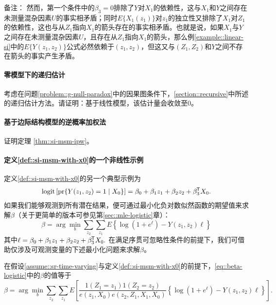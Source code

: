 备注：  
然而，第一个条件中的$\beta_3 = 0$排除了$Y$对$X_1$的依赖性，这与$X_1$和$Y$之间存在未测量混杂因素$U$的事实相矛盾；同时$E\{ X_1(z_1)\} $对$z_1$的独立性又排除了$X_1$对$Z_1$的依赖性，这也与从$Z_1$指向$X_1$的箭头存在的事实相矛盾。也就是说，如果$X_1$与$Y$之间存在未测量混杂因素$U$，且存在从$Z_1$指向$X_1$的箭头，那么例\ref{example::linear-si}中的$E\{ Y(z_1, z_2) \} $公式必然依赖于$(z_1, z_2)$，但这又与$(Z_1, Z_2)$和$Y$之间不存在箭头的事实产生矛盾。  


\paragraph{零模型下的递归估计}\label{problem::recursive-null}


考虑在问题\ref{problem::g-null-paradox}中的因果图条件下，\ref{section::recursive}中所述的递归估计方法。请证明：基于线性模型，该估计量会收敛至0。 



\paragraph{基于边际结构模型的逆概率加权法}\label{problem::ipw-msm}


证明定理 \ref{thm::si-msm-ipw}。 


\paragraph{定义\ref{def::si-msm-with-x0}的一个非线性示例}\label{hw::logistic-msm}


定义\ref{def::si-msm-with-x0}的另一个典型示例为\begin{equation}\label{eq::logistic-msm}
\text{logit} \left[ \textup{pr}\{  Y(z_1, z_2)  =1  \mid X_0\}  \right] = \beta_0 + \beta_1 z_1 + \beta_2 z_2 + \beta_3^{\mkern-1.5mu\mathsf{T}} X_0 .
\end{equation}  
如果我们能够观测到所有潜在结果，便可通过最小化负对数似然函数的期望值来求解$\beta$（关于更简单的版本可参见第\ref{sec::mle-logistic}章）：  
\begin{equation}
\label{eq::beta-logistic}
\beta = \arg\min_b   \sum_{z_2}\sum_{z_1}  E\left\{   \log (1 + e^{\ell })
- Y(z_1, z_2)  \ell  \right\}
\end{equation}  
其中$\ell = \beta_0 + \beta_1 z_1 + \beta_2 z_2 + \beta_3^{\mkern-1.5mu\mathsf{T}} X_0.$  
在满足序贯可忽略性条件的前提下，我们可借助仅涉及可观测变量的下述最小化问题来求解$\beta$。


\begin{theorem}
[在边际结构模型下采用逆概率加权法]
\label{thm::si-msm-ipw-logistic}
在假设\ref{assume::sr-time-varying}与定义\ref{def::si-msm-with-x0}的前提下，\eqref{eq::beta-logistic}中的$\beta$的值等于$$
\beta = \arg\min_b \sum_{z_2}\sum_{z_1}  E\left[   \frac{  1(Z_1=z_1) 1(Z_2=z_2)   }{   e(z_1, X_0) e(z_2, Z_1, X_1, X_0)     }      
\left\{   \log (1 + e^{\ell })
- Y(z_1, z_2)  \ell  \right\} \right] .
$$
\end{theorem}

